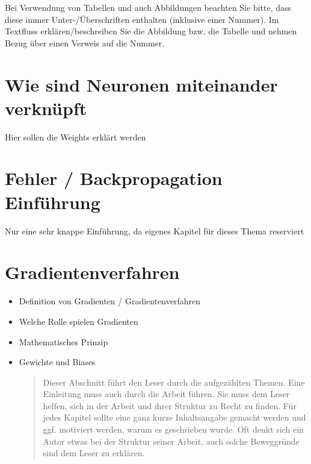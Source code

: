 \documentclass[a4paper,12pt,oneside]{article}
\begin{document}
    \vspace{1cm}
 \begin{tcolorbox}[title={Abbildungen, Tabellen \& Co.}]
Bei Verwendung von Tabellen und auch Abbildungen beachten Sie bitte, dass diese immer Unter-/Überschriften enthalten (inklusive einer Nummer). Im Textfluss erklären/beschreiben Sie die Abbildung bzw. die Tabelle und nehmen Bezug über einen Verweis auf die Nummer.
  \end{tcolorbox}
  
  \newpage 
  \section{Wie sind Neuronen miteinander verknüpft}\label{kap_verknuepfung_neuronen}  
   Hier sollen die Weights erklärt werden

  \newpage
  \section{Fehler / Backpropagation Einführung}\label{kap_fehler_backpropagation}
  Nur eine sehr knappe Einführung, da eigenes Kapitel für dieses Thema reserviert
  


  \newpage
  \section{Gradientenverfahren}
  \begin{tcolorbox}[title={Inhalte des \textit{Gradientenverfahren}}]
    \begin{itemize}
      \item Definition von Gradienten / Gradientenverfahren
      \item Welche Rolle spielen Gradienten
      \item Mathematisches Prinzip
      \item Gewichte und Biases
    \begin{quotation}
        Dieser Abschnitt führt den Leser durch die aufgezählten Themen.
        Eine Einleitung muss auch durch die Arbeit führen. Sie muss dem Leser helfen, sich in der Arbeit und ihrer Struktur zu Recht zu finden.
        Für jedes Kapitel sollte eine ganz kurze Inhaltsangabe gemacht werden und ggf. motiviert werden, warum es geschrieben wurde. 
        Oft denkt sich ein Autor etwas bei der Struktur seiner Arbeit, auch solche Beweggründe sind dem Leser zu erklären. 
    \end{quotation}
    \end{itemize}
  \end{tcolorbox}
\end{document}
